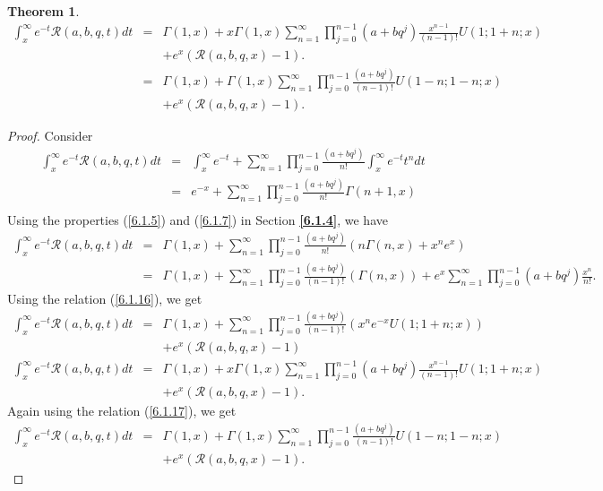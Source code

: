 \documentclass[12pt]{article}
\newtheorem{The}{Theorem}[section]
\numberwithin{equation}{section}
\begin{document}
\begin{The}
\begin{eqnarray}
\int_{x}^\infty e^{-t}\mathcal{R}(a,b,q,t)dt&=& \Gamma (1, x) + x\Gamma (1, x)\sum_{n=1}^\infty \prod_{j=0}^{n-1}\left(a+bq^j\right)\frac {x^{n-1}}{(n-1)!} U(1; 1+n; x)  \nonumber\\
&& + e^x\left(\mathcal{R}(a,b,q,x)-1\right).\\
&=&\Gamma (1, x) + \Gamma (1, x)\sum_{n=1}^\infty \prod_{j=0}^{n-1}\frac {\left(a+bq^j\right)}{(n-1)!} U(1-n; 1-n; x)  \nonumber\\
&& + e^x\left(\mathcal{R}(a,b,q,x)-1\right).
\end{eqnarray}
\end{The}

\begin{proof}
Consider 
\begin{eqnarray*}
\int_{x}^\infty e^{-t}\mathcal{R}(a,b,q,t)dt &=& \int_{x}^\infty e^{-t} + \sum_{n=1}^\infty  \prod_{j=0}^{n-1}\frac {\left(a+bq^j\right)}{n!} \int_{x}^\infty e^{-t}t^n dt\\
&=& e^{-x} + \sum_{n=1}^\infty \prod_{j=0}^{n-1}\frac {\left(a+bq^j\right)}{n!} \Gamma(n+1,x)\\
\end{eqnarray*}
Using the properties (\ref{6.1.5}) and (\ref{6.1.7}) in Section \textbf{\ref{6.1.4}}, we have
\begin{eqnarray*}
\int_{x}^\infty e^{-t}\mathcal{R}(a,b,q,t)dt &=& \Gamma (1, x) + \sum_{n=1}^\infty \prod_{j=0}^{n-1}\frac {\left(a+bq^j\right)}{n!} \left(n\Gamma(n,x)+x^n e^x\right)\\
&=& \Gamma (1, x) + \sum_{n=1}^\infty \prod_{j=0}^{n-1}\frac {\left(a+bq^j\right)}{(n-1)!} \left(\Gamma(n,x)\right)+e^x\sum_{n=1}^\infty \prod_{j=0}^{n-1}\left(a+bq^j\right)\frac {x^n}{n!}.
\end{eqnarray*}
Using the relation (\ref{6.1.16}), we get
\begin{eqnarray*}
\int_{x}^\infty e^{-t}\mathcal{R}(a,b,q,t)dt &=& \Gamma (1, x) + \sum_{n=1}^\infty \prod_{j=0}^{n-1}\frac {\left(a+bq^j\right)}{(n-1)!} \left( x^n e^{-x}U(1; 1+n; x)\right) \nonumber\\ 
&& + e^x\left(\mathcal{R}(a,b,q,x)-1\right)\\
\int_{x}^\infty e^{-t}\mathcal{R}(a,b,q,t)dt&=& \Gamma (1, x) + x\Gamma (1, x)\sum_{n=1}^\infty \prod_{j=0}^{n-1}\left(a+bq^j\right)\frac {x^{n-1}}{(n-1)!} U(1; 1+n; x)  \nonumber\\
&& + e^x\left(\mathcal{R}(a,b,q,x)-1\right).
\end{eqnarray*}
Again using the relation (\ref{6.1.17}), we get
\begin{eqnarray}
\int_{x}^\infty e^{-t}\mathcal{R}(a,b,q,t)dt&=& \Gamma (1, x) + \Gamma (1, x)\sum_{n=1}^\infty \prod_{j=0}^{n-1}\frac {\left(a+bq^j\right)}{(n-1)!} U(1-n; 1-n; x)  \nonumber\\
&& + e^x\left(\mathcal{R}(a,b,q,x)-1\right).
\end{eqnarray}
\end{proof}
\end{document}
